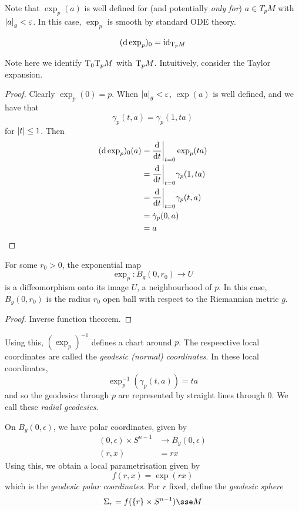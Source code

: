 \documentclass{article}
\begin{document}
Note that \(\exp_p(a)\) is well defined for (and potentially \emph{only for}) \(a \in T_pM\) with \(\abs{a}_g < \varepsilon\). In this case, \(\exp_p\) is smooth by standard ODE theory.

\begin{proposition}
    \[(\dd\exp_p)_0 = \operatorname{id}_{\mathrm{T}_p M}\]
\end{proposition}
Note here we identify \(\mathrm{T}_0\mathrm{T}_pM\) with \(\mathrm{T}_pM\). Intuitively, consider the Taylor expansion.
\begin{proof}
    Clearly \(\exp_p(0) = p\). When \(\abs{a}_g < \varepsilon\), \(\exp(a)\) is well defined, and we have that
    \[\gamma_p(t, a) = \gamma_p(1, ta)\]
    for \(\abs{t} \le 1\). Then
    \begin{align*}
        (\dd \exp_p)_0(a) &= \dv{t}\bigg\vert_{t=0}\exp_p(ta) \\
        &= \dv{t}\bigg\vert_{t=0}\gamma_p(1, ta) \\
        &= \dv{t}\bigg\vert_{t=0}\gamma_p(t, a) \\
        &=\dot\gamma_p(0, a) \\
        &= a
    \end{align*}
\end{proof}

\begin{corollary}
    For some \(r_0 > 0\), the exponential map
    \[\exp_p : B_g(0, r_0) \to U\]
    is a diffeomorphism onto its image \(U\), a neighbourhood of \(p\). In this case, \(B_g(0, r_0)\) is the radius \(r_0\) open ball with respect to the Riemannian metric \(g\).
\end{corollary}

\begin{proof}
    Inverse function theorem.
\end{proof}

Using this, \((\exp_p)^{-1}\) defines a chart around \(p\). The respeective local coordinates are called the \emph{geodesic (normal) coordinates}. In these local coordinates,
\begin{equation}
    \label{eq:exp-geodesic}
    \exp_p^{-1}(\gamma_p(t, a)) = ta
\end{equation}
and so the geodesics through \(p\) are represented by straight lines through \(0\). We call these \emph{radial geodesics}.

On \(B_g(0, \epsilon)\), we have polar coordinates, given by
\begin{align*}
    (0, \epsilon) \times S^{n-1} &\to B_g(0, \epsilon) \\
    (r, x) &= rx
\end{align*}
Using this, we obtain a local parametrisation given by
\[f(r, x) = \exp(rx)\]
which is the \emph{geodesic polar coordinates}. For \(r\) fixed, define the \emph{geodesic sphere}
\[\Sigma_r = f(\{r\} \times S^{n-1}) \sse M\]
\end{document}
